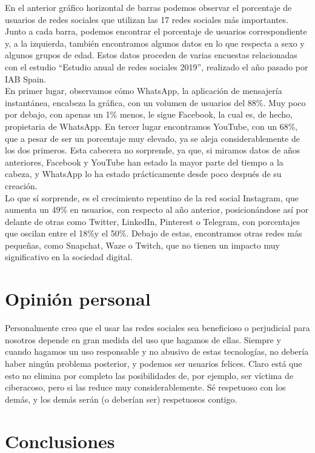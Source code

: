 \documentclass[12pt,a4paper]{article}
\begin{document}
En el anterior gráfico horizontal de barras podemos observar el porcentaje de usuarios de redes sociales que utilizan las 17 redes sociales más importantes. Junto a cada barra, podemos encontrar el porcentaje de usuarios correspondiente y, a la izquierda, también encontramos algunos datos en lo que respecta a sexo y algunos grupos de edad. Estos datos proceden de varias encuestas relacionadas con el estudio ``Estudio anual de redes sociales 2019'', realizado el año pasado por IAB Spain.\\

En primer lugar, observamos cómo WhatsApp, la aplicación de mensajería instantánea, encabeza la gráfica, con un volumen de usuarios del 88\%. Muy poco por debajo, con apenas un 1\% menos, le sigue Facebook, la cual es, de hecho, propietaria de WhatsApp. En tercer lugar encontramos YouTube, con un 68\%, que a pesar de ser un porcentaje muy elevado, ya se aleja considerablemente de los dos primeros. Esta cabecera no sorprende, ya que, si miramos datos de años anteriores, Facebook y YouTube han estado la mayor parte del tiempo a la cabeza, y WhatsApp lo ha estado prácticamente desde poco después de su creación.\\

Lo que sí sorprende, es el crecimiento repentino de la red social Instagram, que aumenta un 49\% en usuarios, con respecto al año anterior, posicionándose así por delante de otras como Twitter, LinkedIn, Pinterest o Telegram, con porcentajes que oscilan entre el 18\%y el 50\%. Debajo de estas, encontramos otras redes más pequeñas, como Snapchat, Waze o Twitch, que no tienen un impacto muy significativo en la sociedad digital.

\section{Opinión personal}

Personalmente creo que el usar las redes sociales sea beneficioso o perjudicial para nosotros depende en gran medida del uso que hagamos de ellas. Siempre y cuando hagamos un uso responsable y no abusivo de estas tecnologías, no debería haber ningún problema posterior, y podemos ser usuarios felices. Claro está que esto no elimina por completo las posibilidades de, por ejemplo, ser víctima de ciberacoso, pero si las reduce muy considerablemente. Sé respetuoso con los demás, y los demás serán (o deberían ser) respetuosos contigo.

\section{Conclusiones}
\end{document}
